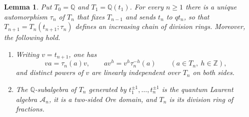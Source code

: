 \documentclass[11pt,a4paper]{amsart}
\newtheorem{lemma}[theorem]{Lemma}
\numberwithin{equation}{section}
\newcommand{\Q}{\mathbb{Q}}
\begin{document}
\begin{lemma}\label{lem:qtorus}
Put $T_0=\Q$ and $T_1=\Q(t_1)$. For every $n\ge1$ there is a unique automorphism $\tau_n$ of $T_n$ that fixes $T_{n-1}$ and sends $t_n$ to $qt_n$, so that $T_{n+1}=T_n(t_{n+1};\tau_n)$ defines an increasing chain of division rings. Moreover, the following hold.
\begin{enumerate}
\item[(1)] Writing $v=t_{n+1}$, one has
\begin{equation}\label{eq:skew}
va=\tau_n(a)v,\qquad av^h=v^h\tau_n^{-h}(a)\qquad(a\in T_n,\ h\in\mathbb Z),
\end{equation}
and distinct powers of $v$ are linearly independent over $T_n$ on both sides.
\item[(2)] The $\Q$-subalgebra of $T_n$ generated by $t_1^{\pm1},\dots,t_n^{\pm1}$ is the quantum Laurent algebra $\mathcal A_n$, it is a two-sided Ore domain, and $T_n$ is its division ring of fractions.
\end{enumerate}
\end{lemma}
\end{document}
